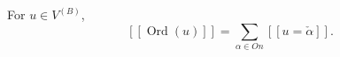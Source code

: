 For $u \in V^{(B)}$,
$$[\![\operatorname{Ord}(u)]\!] = \sum_{\alpha \in On} [\![u = \check{\alpha}]\!].$$

